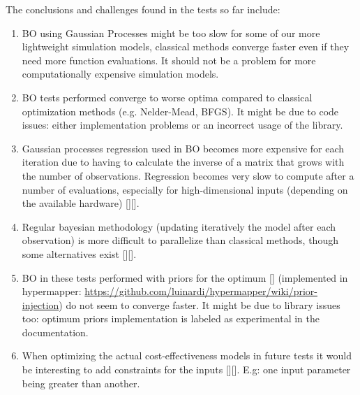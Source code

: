 The conclusions and challenges found in the tests so far include:
\begin{enumerate}
	\item BO using Gaussian Processes might be too slow for some of our more lightweight simulation models, classical methods converge faster even if they need more function evaluations. It should not be a problem for more computationally expensive simulation models.
	\item BO tests performed converge to worse optima compared to classical optimization methods (e.g. Nelder-Mead, BFGS). It might be due to code issues: either implementation problems or an incorrect usage of the library.
	\item Gaussian processes regression used in BO becomes more expensive for each iteration due to having to calculate the inverse of a matrix that grows with the number of observations. Regression becomes very slow to compute after a number of evaluations, especially for high-dimensional inputs (depending on the available hardware) [\cite{proposal:fast_gaussian}][\cite{proposal:splitting_gaussian}].
	\item Regular bayesian methodology (updating iteratively the model after each observation) is more difficult to parallelize than classical methods, though some alternatives exist [\cite{proposal:parallel_bayesian}][\cite{proposal:parallel_bayesian2}].
	\item BO in these tests performed with priors for the optimum [\cite{proposal:bayesian_prior}] (implemented in hypermapper: \url{https://github.com/luinardi/hypermapper/wiki/prior-injection}) do not seem to converge faster. It might be due to library issues too: optimum priors implementation is labeled as experimental in the documentation.
	\item When optimizing the actual cost-effectiveness models in future tests it would be interesting to add constraints for the inputs [\cite{proposal:bayesian_constraints}][\cite{proposal:bayesian_constraints2}]. E.g: one input parameter being greater than another.
\end{enumerate}